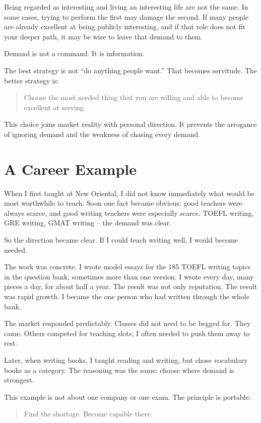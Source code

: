 Being regarded as interesting and living an interesting life are not the same. In some cases, trying to perform the first may damage the second. If many people are already excellent at being publicly interesting, and if that role does not fit your deeper path, it may be wise to leave that demand to them.

Demand is not a command. It is information.

The best strategy is not ``do anything people want.'' That becomes servitude. The better strategy is:

\begin{quote}
Choose the most needed thing that you are willing and able to become excellent at serving.
\end{quote}

This choice joins market reality with personal direction. It prevents the arrogance of ignoring demand and the weakness of chasing every demand.

\section*{A Career Example}

When I first taught at New Oriental, I did not know immediately what would be most worthwhile to teach. Soon one fact became obvious: good teachers were always scarce, and good writing teachers were especially scarce. TOEFL writing, GRE writing, GMAT writing -- the demand was clear.

So the direction became clear. If I could teach writing well, I would become needed.

The work was concrete. I wrote model essays for the 185 TOEFL writing topics in the question bank, sometimes more than one version. I wrote every day, many pieces a day, for about half a year. The result was not only reputation. The result was rapid growth. I became the one person who had written through the whole bank.

The market responded predictably. Classes did not need to be begged for. They came. Others competed for teaching slots; I often needed to push them away to rest.

Later, when writing books, I taught reading and writing, but chose vocabulary books as a category. The reasoning was the same: choose where demand is strongest.

This example is not about one company or one exam. The principle is portable:

\begin{quote}
Find the shortage. Become capable there.
\end{quote}

